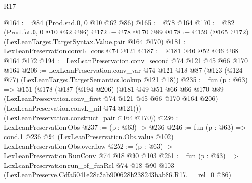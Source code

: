 \begin{lexlean}{R17}
\begin{coremodule}
@164 := @84 (Prod.snd.{0, 0} @10 @62 @86)
@165 := @78 @164
@170 := @82 (Prod.fst.{0, 0} @10 @62 @86)
@172 := @78 @170 @89
@178 := @159 (@165 @172) (LexLeanTarget.TargetSyntax.Value.pair @164 @170)
@181 := LexLeanPreservation.convL_cons @74 @121
@187 := @181 @46 @52 @66 @68 @164 @172
@194 := LexLeanPreservation.conv_second @74 @121 @45 @66 @170 @164
@206 := LexLeanPreservation.conv_var
    @74
    @121
    @18
    @87
    (@123 (@124 @77) (LexLeanTarget.TargetSemantics.lookup @121 @18))
@235 := fun (p : @63) =>
  @151
    (@178
      (@187
        (@194 @206)
        (@181
          @49
          @51
          @66
          @66
          @170
          @89
          (LexLeanPreservation.conv_first @74 @121 @45 @66 @170 @164 @206)
          (LexLeanPreservation.convL_nil @74 @121)))
      (LexLeanPreservation.construct_pair @164 @170))
@236 := LexLeanPreservation.Obs
@237 := (p : @63) -> @236
@246 := fun (p : @63) =>
  cond.{1} @236 @94 (LexLeanPreservation.Obs.value @102) LexLeanPreservation.Obs.overflow
@252 := (p : @63) -> LexLeanPreservation.RunConv @74 @18 @90 @103
@261 := fun (p : @63) =>
  LexLeanPreservation.run_of_funRel
    @74
    @18
    @90
    @103
    (LexLeanPreserve.Cdfa5041e28c2ab900628b238243bab86.R17.__rel_0 @86)
\end{coremodule}
\end{lexlean}
